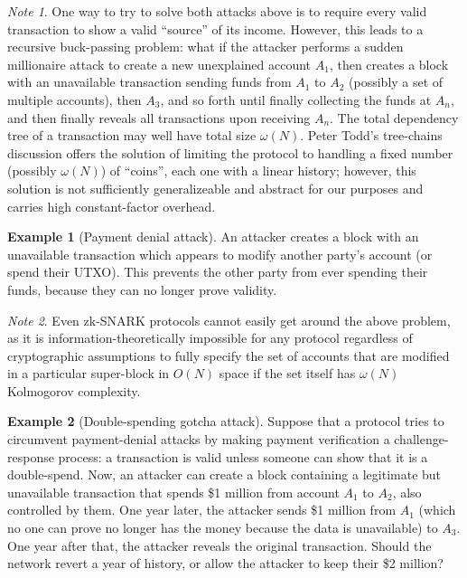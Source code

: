 \documentclass[11pt,a4paper]{report}
\theoremstyle{plain}
\theoremstyle{definition}
\newtheorem{exmp}{Example}[section]
\theoremstyle{remark}
\newtheorem*{note}{Note}
\begin{document}
\begin{note}
One way to try to solve both attacks above is to require every valid transaction to show a valid ``source'' of its income. However, this leads to a recursive buck-passing problem: what if the attacker performs a sudden millionaire attack to create a new unexplained account $A_1$, then creates a block with an unavailable transaction sending funds from $A_1$ to $A_2$ (possibly a set of multiple accounts), then $A_3$, and so forth until finally collecting the funds at $A_n$, and then finally reveals all transactions upon receiving $A_n$. The total dependency tree of a transaction may well have total size $\omega(N)$. Peter Todd's tree-chains discussion offers the solution\cite{treechains} of limiting the protocol to handling a fixed number (possibly $\omega(N)$) of ``coins'', each one with a linear history; however, this solution is not sufficiently generalizeable and abstract for our purposes and carries high constant-factor overhead.
\end{note}

\begin{exmp}[Payment denial attack]
An attacker creates a block with an unavailable transaction which appears to modify another party's account (or spend their UTXO). This prevents the other party from ever spending their funds, because they can no longer prove validity.
\end{exmp}

\begin{note}
Even zk-SNARK protocols cannot easily get around the above problem, as it is information-theoretically impossible for any protocol regardless of cryptographic assumptions to fully specify the set of accounts that are modified in a particular super-block in $O(N)$ space if the set itself has $\omega(N)$ Kolmogorov complexity.
\end{note}

\begin{exmp}[Double-spending gotcha attack]
Suppose that a protocol tries to circumvent payment-denial attacks by making payment verification a challenge-response process: a transaction is valid unless someone can show that it is a double-spend. Now, an attacker can create a block containing a legitimate but unavailable transaction that spends \$1 million from account $A_1$ to $A_2$, also controlled by them. One year later, the attacker sends \$1 million from $A_1$ (which no one can prove no longer has the money because the data is unavailable) to $A_3$. One year after that, the attacker reveals the original transaction. Should the network revert a year of history, or allow the attacker to keep their \$2 million?
\end{exmp}
\end{document}
